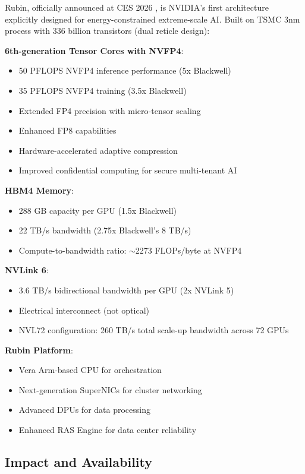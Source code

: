 \documentclass{article}
\begin{document}
Rubin, officially announced at CES 2026 \cite{nvidia2024rubin}, is NVIDIA's first architecture explicitly designed for energy-constrained extreme-scale AI. Built on TSMC 3nm process with 336 billion transistors (dual reticle design):

\textbf{6th-generation Tensor Cores with NVFP4}:
\begin{itemize}
\item 50 PFLOPS NVFP4 inference performance (5x Blackwell)
\item 35 PFLOPS NVFP4 training (3.5x Blackwell)
\item Extended FP4 precision with micro-tensor scaling
\item Enhanced FP8 capabilities
\item Hardware-accelerated adaptive compression
\item Improved confidential computing for secure multi-tenant AI
\end{itemize}

\textbf{HBM4 Memory}:
\begin{itemize}
\item 288 GB capacity per GPU (1.5x Blackwell)
\item 22 TB/s bandwidth (2.75x Blackwell's 8 TB/s)
\item Compute-to-bandwidth ratio: $\sim$2273 FLOPs/byte at NVFP4
\end{itemize}

\textbf{NVLink 6}:
\begin{itemize}
\item 3.6 TB/s bidirectional bandwidth per GPU (2x NVLink 5)
\item Electrical interconnect (not optical)
\item NVL72 configuration: 260 TB/s total scale-up bandwidth across 72 GPUs
\end{itemize}

\textbf{Rubin Platform}:
\begin{itemize}
\item Vera Arm-based CPU for orchestration
\item Next-generation SuperNICs for cluster networking
\item Advanced DPUs for data processing
\item Enhanced RAS Engine for data center reliability
\end{itemize}

\subsection{Impact and Availability}
\end{document}
